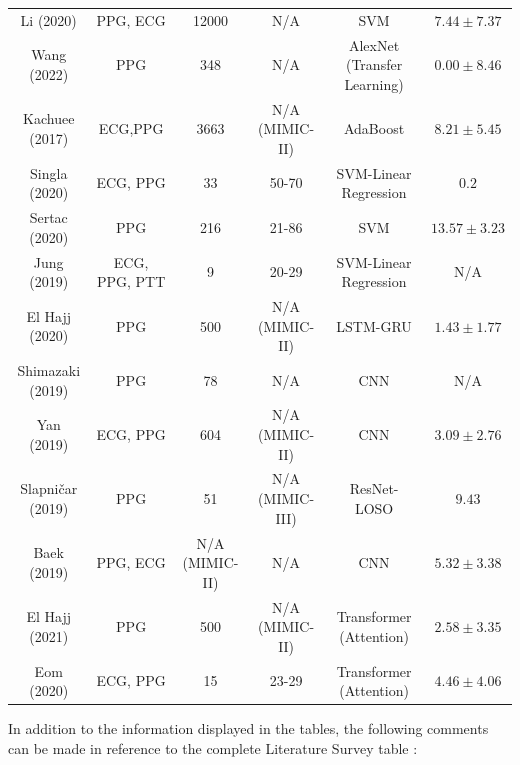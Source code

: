 \begin{landscape}
\begin{table}[H]
{\begin{tabular}{|c|c|c|c|c|c|}
        Li (2020) \cite{Li20212} & PPG, ECG & 12000 & N/A  & SVM & $7.44 \pm 7.37$ \\ 
        Wang (2022) \cite{Wang2022} & PPG & 348 & N/A & AlexNet (Transfer Learning) & $0.00 \pm 8.46$\\
        Kachuee (2017) \cite{kachuee2017} & ECG,PPG & 3663 & N/A (MIMIC-II) & AdaBoost & $8.21 \pm 5.45$\\
        Singla (2020) \cite{singhla2020} & ECG, PPG & 33 & 50-70 & SVM-Linear Regression & $0.2$\\
        Sertac (2020) \cite{sertac2020} & PPG & 216 & 21-86 & SVM & $13.57 \pm 3.23$\\ 
        Jung (2019) \cite{jung2019} & ECG, PPG, PTT & 9 & 20-29 & SVM-Linear Regression & N/A\\
        El Hajj (2020) \cite{ElHajj20202} & PPG & 500 & N/A (MIMIC-II) & LSTM-GRU & $1.43 \pm 1.77$\\
        Shimazaki (2019) \cite{Shimazaki2019} & PPG & 78 & N/A & CNN & N/A\\
        Yan (2019) \cite{Yan2019} & ECG, PPG & 604 & N/A (MIMIC-II) & CNN & $3.09 \pm 2.76$\\
        Slapničar (2019)\cite{slapnicar2019} & PPG & 51 & N/A (MIMIC-III) & ResNet-LOSO & $9.43$\\
        Baek (2019) \cite{Baek2019} & PPG, ECG & N/A (MIMIC-II) & N/A & CNN & $5.32 \pm 3.38$\\
        El Hajj (2021) \cite{ElHajj2021} & PPG & 500 & N/A (MIMIC-II) & Transformer (Attention) & $2.58 \pm 3.35$\\
        Eom (2020) \cite{Eom2020} & ECG, PPG & 15 & 23-29 & Transformer (Attention) & $4.46 \pm 4.06$\\\hline
        \end{tabular}
        }
        \label{litsurveytab2}
    \end{table}
\end{landscape}\noindent In addition to the information displayed in the tables, the following 
comments can be made in reference to the complete Literature Survey table \cite{LitSurvey}:
